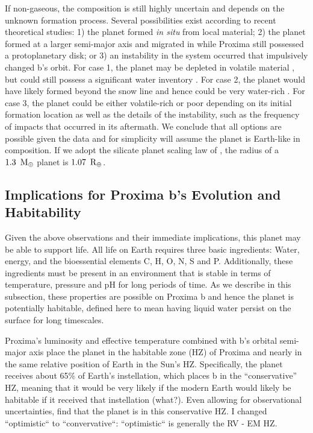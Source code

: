 \documentclass[preprint,12pt]{aastex}
\newcommand{\xxx}[1]{{\color{red} #1}} %
\def\mearth{{\rm\,M_\oplus}}
\def\rearth{{\rm\,R_\oplus}}
\begin{document}
If non-gaseous, the composition is still highly uncertain and depends
on the unknown formation process. Several possibilities exist
according to recent theoretical studies: 1) the planet formed {\it in
  situ} from local material; 2) the planet formed at a larger
semi-major axis and migrated in while Proxima still possessed a
protoplanetary disk; or 3) an instability in the system occurred that
impulsively changed b's orbit. For case 1, the planet may be depleted
in volatile material \citep{Raymond07,Lissauer07}, but could still
possess a significant water inventory \citep{Mulders15}. For case 2,
the planet would have likely formed beyond the snow line and hence
could be very water-rich \citep{CarterBond12}. For case 3, the planet
could be either volatile-rich or poor depending on its initial
formation location as well as the details of the instability, such as
the frequency of impacts that occurred in its aftermath. We conclude
that all options are possible given the data and for simplicity will
assume the planet is Earth-like in composition. If we adopt the
silicate planet scaling law of \cite{Sotin07}, the radius of a
$1.3~\mearth$ planet is $1.07~\rearth$.

\subsection{Implications for Proxima b's Evolution and Habitability}
\label{sec:models:imp}

Given the above observations and their immediate implications, this
planet may be able to support life. All life on Earth requires three
basic ingredients: Water, energy, and the bioessential elements C,
H, O, N, S and P. Additionally, these ingredients must be present in an
environment that is stable in terms of temperature, pressure and pH
for long periods of time. As we describe in this subsection, these
properties are possible on Proxima b and hence the planet is
potentially habitable, defined here to mean having liquid water persist on
the surface for long timescales.

Proxima's luminosity and effective temperature combined with b's
orbital semi-major axis place the planet in the habitable zone (HZ) of
Proxima and nearly in the same relative position of Earth in the Sun's
HZ. Specifically, the planet receives about 65\% of Earth's
instellation, which places b in the ``conservative'' HZ, \xxx{meaning that it
would be very likely if the modern Earth would likely be habitable if
it received that instellation (what?)}. Even allowing for observational
uncertainties, \cite{AngladaEscude16} find that the planet is in this
conservative HZ. \xxx{I changed ``optimistic`` to ``convervative``: ``optimistic``
is generally the RV - EM HZ.}
\end{document}
